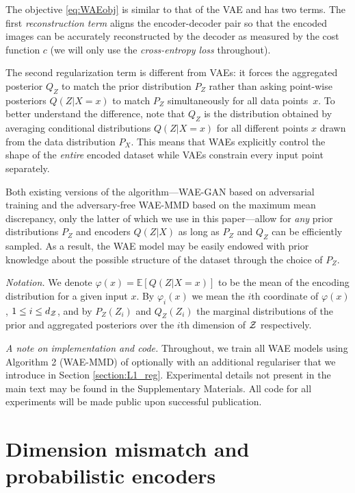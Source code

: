 The objective \eqref{eq:WAEobj} is similar to that of the VAE and has two terms. 
The first \emph{reconstruction term} aligns the encoder-decoder pair so that the encoded images can be accurately reconstructed by the decoder as measured by the cost function $c$ (we will only use the \emph{cross-entropy loss}  throughout).

The second regularization term is different from VAEs: it forces the aggregated posterior $Q_Z$ to match the prior distribution $P_Z$ rather than asking point-wise posteriors $Q(Z|X=x)$ to match $P_Z$ simultaneously for all data points~$x$.
To better understand the difference, note that $Q_Z$ is the distribution obtained by averaging conditional distributions $Q(Z|X=x)$ for all different points $x$ drawn from the data distribution $P_X$.
This means that WAEs explicitly control the shape of the \emph{entire} encoded dataset while VAEs constrain every input point separately.

Both existing versions of the algorithm---WAE-GAN based on adversarial training and the adversary-free WAE-MMD based on the maximum mean discrepancy, only the latter of which we use in this paper---allow for \emph{any} prior distributions $P_Z$ and encoders $Q(Z|X)$ as long as $P_Z$ and $Q_Z$ can be efficiently sampled.
As a result, the WAE model may be easily endowed  with prior knowledge about the possible structure of the dataset through the choice of $P_Z$.

\emph{Notation.} We denote $\varphi(x) = \mathbb{E}\left[Q(Z|X=x)\right]$ to be the mean of the encoding distribution for a given input $x$. By $\varphi_i(x)$ we mean the $i$th coordinate of $\varphi(x)$, $1\leq i \leq d_{\mathcal{Z}}$, and by $P_Z(Z_i)$ and $Q_Z(Z_i)$ the marginal distributions of the prior and aggregated posteriors over the $i$th dimension of $\mathcal{Z}$ respectively. 

\emph{A note on implementation and code.} Throughout, we train all WAE models using Algorithm 2 (WAE-MMD) of \cite{TBG+17} optionally with an additional regulariser that we introduce in Section \ref{section:L1_reg}. Experimental details not present in the main text may be found in the Supplementary Materials. All code for all experiments will be made public upon successful publication. 


\section{Dimension mismatch and probabilistic encoders\label{section:fading-squares}}

